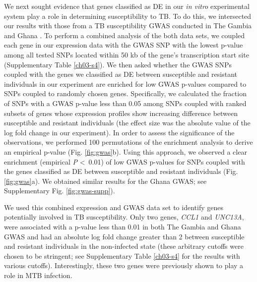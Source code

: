 We next sought evidence that genes classified as DE in our \emph{in
vitro} experimental system play a role in determining susceptibility
to TB. To do this, we intersected our results with those from a TB
susceptibility GWAS conducted in The Gambia and Ghana \citep{Thye2010}.
To perform a combined analysis of the both data sets, we coupled each
gene in our expression data with the GWAS SNP with the lowest p-value
among all tested SNPs located within 50 kb of the gene’s transcription
start site (Supplementary Table \ref{ch03-s4}). We then asked whether the GWAS
SNPs coupled with the genes we classified as DE between susceptible
and resistant individuals in our experiment are enriched for low GWAS
p-values compared to SNPs coupled to randomly chosen genes.
Specifically, we calculated the fraction of SNPs with a GWAS p-value
less than 0.05 among SNPs coupled with ranked subsets of genes whose
expression profiles show increasing difference between susceptible and
resistant individuals (the effect size was the absolute value of the
log fold change in our experiment). In order to assess the
significance of the observations, we performed 100 permutations of the
enrichment analysis to derive an empirical p-value (Fig.
\ref{fig:gwas}b). Using this approach, we observed a clear enrichment
(empirical \emph{P} \textless \, 0.01) of low GWAS p-values for SNPs
coupled with the genes classified as DE between susceptible and
resistant individuals (Fig. \ref{fig:gwas}a). We obtained similar
results for the Ghana GWAS; see Supplementary Fig.
\ref{fig:gwas-supp}).

We used this combined expression and GWAS data set to identify genes
potentially involved in TB susceptibility. Only two genes, \emph{CCL1}
and \emph{UNC13A}, were associated with a p-value less than 0.01 in
both The Gambia and Ghana GWAS and had an absolute log fold change
greater than 2 between susceptible and resistant individuals in the
non-infected state (these arbitrary cutoffs were chosen to be
stringent; see Supplementary Table \ref{ch03-s4} for the results with various
cutoffs). Interestingly, these two genes were previously shown to play
a role in MTB infection.

